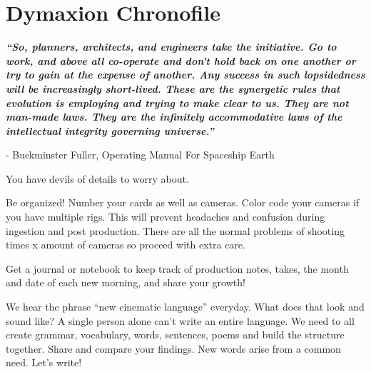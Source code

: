 \section{Dymaxion Chronofile}
\pagecolor{white}
\label{chap:27}
\begin{fullwidth}

{\itshape\bfseries “So, planners, architects, and engineers take the initiative. Go to work, and above all co-operate and don't hold back on one another or try to gain at the expense of another. Any success in such lopsidedness will be increasingly short-lived. These are the synergetic rules that evolution is employing and trying to make clear to us. They are not man-made laws. They are the infinitely accommodative laws of the intellectual integrity governing universe.”}

- Buckminster Fuller, Operating Manual For Spaceship Earth
\vspace{\baselineskip}

\problem

{\large You have devils of details to worry about. \par}

Be organized! Number your cards as well as cameras. Color code your cameras if you have multiple rigs. This will prevent headaches and confusion during ingestion and post production. There are all the normal problems of shooting times x amount of cameras so proceed with extra care. 


\solution

{\large Get a journal or notebook to keep track of production notes, takes, the month and date of each new morning, and share your growth! \par}

We hear the phrase “new cinematic language” everyday. What does that look and sound like? A single person alone can’t write an entire language. We need to all create grammar, vocabulary, words, sentences, poems and build the structure together. Share and compare your findings. New words arise from a common need.  Let’s write!




\clearpage
\end{fullwidth}
